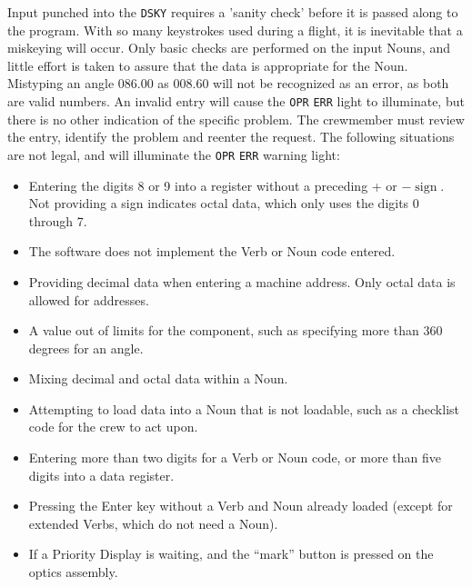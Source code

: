 \documentclass[refcap, oxford]{ahsan}
\begin{document}
Input punched into the \texttt{DSKY} requires a 'sanity check' before it is passed along to the program. With so many keystrokes used during a flight, it is inevitable that a miskeying will occur. Only basic checks are performed on the input Nouns, and little effort is taken to assure that the data is appropriate for the Noun. Mistyping an angle 086.00 as 008.60 will not be recognized as an error, as both are valid numbers. An invalid entry will cause the \texttt{OPR} \texttt{ERR} light to illuminate, but there is no other indication of the specific problem. The crewmember must review the entry, identify the problem and reenter the request. The following situations are not legal, and will illuminate the \texttt{OPR} \texttt{ERR} warning light:

\begin{itemize}
  \item Entering the digits 8 or 9 into a register without a preceding + or $-\operatorname{sign}$. Not providing a sign indicates octal data, which only uses the digits 0 through 7.
  \item The software does not implement the Verb or Noun code entered.
\end{itemize}


\begin{itemize}
  \item Providing decimal data when entering a machine address. Only octal data is allowed for addresses.
  \item A value out of limits for the component, such as specifying more than 360 degrees for an angle.
  \item Mixing decimal and octal data within a Noun.
  \item Attempting to load data into a Noun that is not loadable, such as a checklist code for the crew to act upon.
  \item Entering more than two digits for a Verb or Noun code, or more than five digits into a data register.
  \item Pressing the Enter key without a Verb and Noun already loaded (except for extended Verbs, which do not need a Noun).
  \item If a Priority Display is waiting, and the ``mark'' button is pressed on the optics assembly.
\end{itemize}
\end{document}
